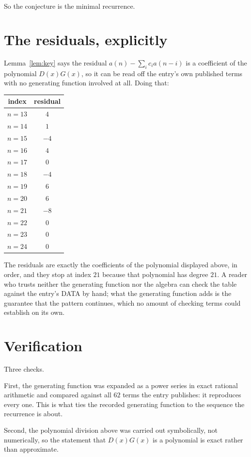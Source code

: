\documentclass[11pt,a4paper]{article}
\theoremstyle{plain}
\theoremstyle{definition}
\begin{document}
So the conjecture is the minimal recurrence.

\section{The residuals, explicitly}

Lemma~\ref{lem:key} says the residual $a(n)-\sum_ic_ia(n-i)$ is a coefficient of the
polynomial $D(x)G(x)$, so it can be read off the entry's own published terms with no
generating function involved at all. Doing that:
\begin{center}
\begin{tabular}{cc}
index & residual \\ \hline
$n=13$ & $4$ \\
$n=14$ & $1$ \\
$n=15$ & $-4$ \\
$n=16$ & $4$ \\
$n=17$ & $0$ \\
$n=18$ & $-4$ \\
$n=19$ & $6$ \\
$n=20$ & $6$ \\
$n=21$ & $-8$ \\
$n=22$ & $0$ \\
$n=23$ & $0$ \\
$n=24$ & $0$
\end{tabular}
\end{center}
The residuals are exactly the coefficients of the polynomial displayed above, in order, and
they stop at index $21$ because that polynomial has degree $21$. A reader who trusts
neither the generating function nor the algebra can check the table against the entry's DATA
by hand; what the generating function adds is the guarantee that the pattern continues, which
no amount of checking terms could establish on its own.

\section{Verification}

Three checks.

First, the generating function was expanded as a power series in exact rational arithmetic and
compared against all $62$ terms the entry publishes: it reproduces every one. This is
what ties the recorded generating function to the sequence the recurrence is about.

Second, the polynomial division above was carried out symbolically, not numerically, so the
statement that $D(x)G(x)$ is a polynomial is exact rather than approximate.
\end{document}

